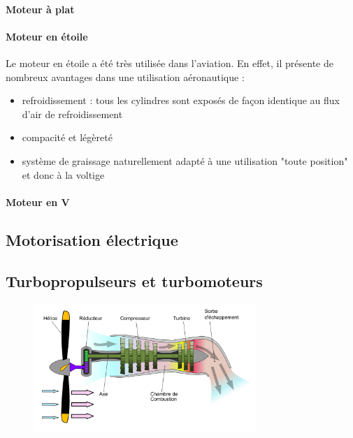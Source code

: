 	\paragraph{Moteur à plat}
	
	\paragraph{Moteur en étoile}
	Le moteur en étoile  a été très utilisée dans l'aviation. En effet, il présente de nombreux avantages dans une utilisation aéronautique :
	\begin{itemize}
		\item refroidissement : tous les cylindres sont exposés de façon identique au flux d'air de refroidissement
		\item compacité et légèreté
		\item système de graissage naturellement adapté à une utilisation "toute position" et donc à la voltige
	\end{itemize}
	
	
	\paragraph{Moteur en V}
	
	\subsection{Motorisation électrique}
	
	\subsection{Turbopropulseurs et turbomoteurs}
	\begin{figure}[H]
  	\centering
    \includegraphics[width=0.75\textwidth]{01-EtudeAeronefs/img/turbomachines/turbopropulseur.pdf}
	\end{figure}	
	

